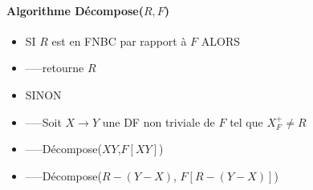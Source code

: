 \documentclass[10pt,a4paper]{article}
\begin{document}
\paragraph{Algorithme Décompose($R,F$)}
\begin{itemize}
\item[] SI $R$ est en FNBC par rapport à $F$ ALORS
\item[] -----retourne $R$
\item[] SINON
\item[] -----Soit $X \rightarrow Y$ une DF non triviale de $F$ tel que $X_{F}^{+} \neq R$
\item[] -----Décompose($XY$,$F[XY]$)
\item[] -----Décompose($R-(Y-X)$, $F[R-(Y-X)]$)

\end{itemize}
\end{document}
